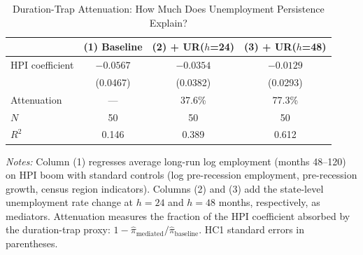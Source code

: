 \begin{table}[H]
\centering
\caption{Duration-Trap Attenuation: How Much Does Unemployment Persistence Explain?}
\begin{threeparttable}
\begin{tabular}{lccc}
\toprule
& (1) Baseline & (2) + UR($h$=24) & (3) + UR($h$=48) \\
\midrule
HPI coefficient & $-0.0567$ & $-0.0354$ & $-0.0129$ \\
& (0.0467) & (0.0382) & (0.0293) \\[4pt]
Attenuation & --- & 37.6\% & 77.3\% \\
$N$ & 50 & 50 & 50 \\
$R^2$ & 0.146 & 0.389 & 0.612 \\
\bottomrule
\end{tabular}
\begin{tablenotes}[flushleft]
\small
\item \textit{Notes:} Column (1) regresses average long-run log employment (months 48--120) on HPI boom with standard controls (log pre-recession employment, pre-recession growth, census region indicators). Columns (2) and (3) add the state-level unemployment rate change at $h=24$ and $h=48$ months, respectively, as mediators. Attenuation measures the fraction of the HPI coefficient absorbed by the duration-trap proxy: $1 - \hat{\pi}_{\text{mediated}} / \hat{\pi}_{\text{baseline}}$. HC1 standard errors in parentheses.
\end{tablenotes}
\end{threeparttable}
\label{tab:attenuation}
\end{table}
